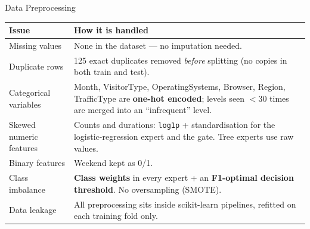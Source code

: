 \documentclass[aspectratio=169,11pt]{beamer}
\begin{document}
\begin{frame}{Data Preprocessing}
  \footnotesize
  \begin{tabular}{@{}p{33mm}p{100mm}@{}}
    \toprule
    \textbf{Issue} & \textbf{How it is handled} \\
    \midrule
    Missing values & None in the dataset --- no imputation needed. \\[2pt]
    Duplicate rows & 125 exact duplicates removed \emph{before} splitting (no copies in both train and test). \\[2pt]
    Categorical variables & Month, VisitorType, OperatingSystems, Browser, Region, TrafficType are \textbf{one-hot encoded}; levels seen $<30$ times are merged into an ``infrequent'' level. \\[2pt]
    Skewed numeric features & Counts and durations: \texttt{log1p} + standardisation for the logistic-regression expert and the gate. Tree experts use raw values. \\[2pt]
    Binary features & Weekend kept as 0/1. \\[2pt]
    Class imbalance & \textbf{Class weights} in every expert + an \textbf{F1-optimal decision threshold}. No oversampling (SMOTE). \\[2pt]
    Data leakage & All preprocessing sits inside scikit-learn pipelines, refitted on each training fold only. \\
    \bottomrule
  \end{tabular}
\end{frame}
\end{document}
